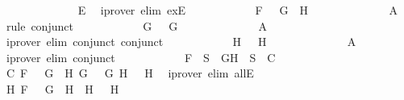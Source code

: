 \begin{isabellebody}
\ \ \ \ \ \ \ \ \ \ \ \ \isamarkupfalse%
\ E{}\ \isamarkupfalse%
\ {\isacharparenleft}iprover\ elim{\isacharcolon}\ exE{\isacharparenright}\isanewline
\ \ \ \ \ \ \ \ \ \ \isamarkupfalse%
\ {\isachardoublequoteopen}F\ {\isacharequal}\ \isactrlbold {\isasymnot}\ {\isacharparenleft}G{}\ \isactrlbold {\isasymor}\ H{}{\isacharparenright}{\isachardoublequoteclose}\isanewline
\ \ \ \ \ \ \ \ \ \ \ \ \isamarkupfalse%
\ A{}\ \isamarkupfalse%
\ {\isacharparenleft}rule\ conjunct{}{\isacharparenright}\isanewline
\ \ \ \ \ \ \ \ \ \ \isamarkupfalse%
\ {\isachardoublequoteopen}G\ {\isacharequal}\ \isactrlbold {\isasymnot}\ G{}{\isachardoublequoteclose}\isanewline
\ \ \ \ \ \ \ \ \ \ \ \ \isamarkupfalse%
\ A{}\ \isamarkupfalse%
\ {\isacharparenleft}iprover\ elim{\isacharcolon}\ conjunct{}\ conjunct{}{\isacharparenright}\isanewline
\ \ \ \ \ \ \ \ \ \ \isamarkupfalse%
\ {\isachardoublequoteopen}H\ {\isacharequal}\ \isactrlbold {\isasymnot}\ H{}{\isachardoublequoteclose}\isanewline
\ \ \ \ \ \ \ \ \ \ \ \ \isamarkupfalse%
\ A{}\ \isamarkupfalse%
\ {\isacharparenleft}iprover\ elim{\isacharcolon}\ conjunct{}{\isacharparenright}\isanewline
\ \ \ \ \ \ \ \ \ \ \isamarkupfalse%
\ {\isachardoublequoteopen}F\ {\isasymin}\ S\ {\isasymlongrightarrow}\ {\isacharbraceleft}G{\isacharcomma}H{\isacharbraceright}\ {\isasymunion}\ S\ {\isasymin}\ C{\isachardoublequoteclose}\isanewline
\ \ \ \ \ \ \ \ \ \ \ \ \isamarkupfalse%
\ C{}\ {\isacartoucheopen}F\ {\isacharequal}\ \isactrlbold {\isasymnot}\ {\isacharparenleft}G{}\ \isactrlbold {\isasymor}\ H{}{\isacharparenright}{\isacartoucheclose}\ {\isacartoucheopen}G\ {\isacharequal}\ \isactrlbold {\isasymnot}\ G{}{\isacartoucheclose}\ {\isacartoucheopen}H\ {\isacharequal}\ \isactrlbold {\isasymnot}\ H{}{\isacartoucheclose}\ \isamarkupfalse%
\ {\isacharparenleft}iprover\ elim{\isacharcolon}\ allE{\isacharparenright}\isanewline
\ \ \ \ \ \ \ \ \isamarkupfalse%
\isanewline
\ \ \ \ \ \ \ \ \ \ \isamarkupfalse%
\ {\isachardoublequoteopen}{\isacharparenleft}{\isasymexists}H{}{\isachardot}\ F\ {\isacharequal}\ \isactrlbold {\isasymnot}\ {\isacharparenleft}G\ \isactrlbold {\isasymrightarrow}\ H{}{\isacharparenright}\ {\isasymand}\ H\ {\isacharequal}\ \isactrlbold {\isasymnot}\ H{}{\isacharparenright}\ {\isasymor}\ \isanewline

\end{isabellebody}
